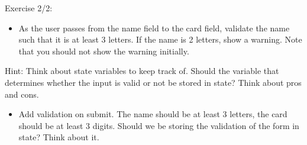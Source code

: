 \documentclass[presentation]{beamer}
\begin{document}
\begin{frame}[label=sec-16]{Exercise 2/2:}
\begin{itemize}
\item As the user passes from the name field to the card field, validate the name
such that it is at least 3 letters. If the name is 2 letters, show a
warning. Note that you should not show the warning initially.
\end{itemize}

Hint: Think about state variables to keep track of. Should the variable that
determines whether the input is valid or not be stored in state? Think about
pros and cons.

\begin{itemize}
\item Add validation on submit. The name should be at least 3 letters, the card
should be at least 3 digits. Should we be storing the validation of the form
in state? Think about it.
\end{itemize}
\end{frame}
\end{document}
